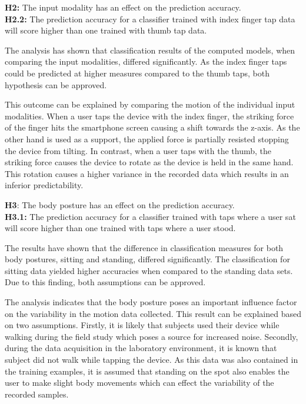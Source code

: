 \begin{center}
  \begin{framed}
    \textbf{H2:} The input modality has an effect on the prediction accuracy.\\
    \textbf{H2.2:} The prediction accuracy for a classifier trained with index finger tap data will score higher than one trained with thumb tap data.
  \end{framed}
\end{center}

The analysis has shown that classification results of the computed models, when comparing the input modalities, differed significantly. As the index finger taps could be predicted at higher measures compared to the thumb taps, both hypothesis can be approved.

This outcome can be explained by comparing the motion of the individual input modalities. When a user taps the device with the index finger, the striking force of the finger hits the smartphone screen causing a shift towards the z-axis. As the other hand is used as a support, the applied force is partially resisted stopping the device from tilting. In contrast, when a user taps with the thumb, the striking force causes the device to rotate as the device is held in the same hand. This rotation causes a higher variance in the recorded data which results in an inferior predictability.



\begin{center}
  \begin{framed}
    \textbf{H3}: The body posture has an effect on the prediction accuracy.\\
    \textbf{H3.1:} The prediction accuracy for a classifier trained with taps where a user sat will score higher than one trained with taps where a user stood.
  \end{framed}
\end{center}

The results have shown that the difference in classification measures for both body postures, sitting and standing, differed significantly. The classification for sitting data yielded higher accuracies when compared to the standing data sets. Due to this finding, both assumptions can be approved.

The analysis indicates that the body posture poses an important influence factor on the variability in the motion data collected. This result can be explained based on two assumptions. Firstly, it is likely that subjects used their device while walking during the field study which poses a source for increased noise. Secondly, during the data acquisition in the laboratory environment, it is known that subject did not walk while tapping the device. As this data was also contained in the training examples, it is assumed that standing on the spot also enables the user to make slight body movements which can effect the variability of the recorded samples.

